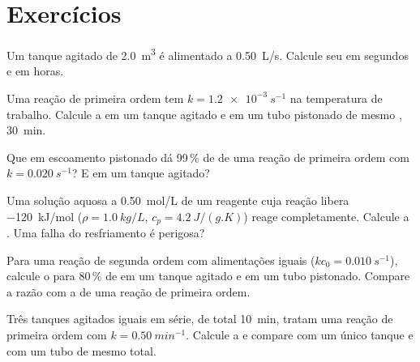 \section{Exercícios}

\begin{exercise}[$\star$]\label{exo:b2:continuous-reactors:1}
Um tanque agitado de \qty{2.0}{m^3} é alimentado a \qty{0.50}{L/s}. Calcule seu
 em segundos e em horas.
\end{exercise}

\begin{exercise}[$\star$]\label{exo:b2:continuous-reactors:2}
Uma reação de primeira ordem tem $k = \qty{1.2e-3}{s^{-1}}$ na temperatura de
trabalho. Calcule a  em um tanque agitado e em um tubo pistonado
de mesmo , \qty{30}{min}.
\end{exercise}

\begin{exercise}[$\star$]\label{exo:b2:continuous-reactors:3}
Que  em escoamento pistonado dá 99\,\% de  de uma
reação de primeira ordem com $k = \qty{0.020}{s^{-1}}$? E em um tanque agitado?
\end{exercise}

\begin{exercise}[$\star$]\label{exo:b2:continuous-reactors:4}
Uma solução aquosa a \qty{0.50}{mol/L} de um reagente cuja reação
libera \qty{-120}{kJ/mol} ($\rho = \qty{1.0}{kg/L}$, $c_p =
\qty{4.2}{J/(g.K)}$) reage completamente. Calcule a . Uma falha do resfriamento é perigosa?
\end{exercise}

\begin{exercise}[$\star\star$]\label{exo:b2:continuous-reactors:5}
Para uma reação de segunda ordem com alimentações iguais ($kc_0 = \qty{0.010}{s^{-1}}$),
calcule o  para 80\,\% de  em um tanque agitado e em um
tubo pistonado. Compare a razão com a de uma reação de primeira ordem.
\end{exercise}

\begin{exercise}[$\star\star$]\label{exo:b2:continuous-reactors:6}
Três tanques agitados iguais em série, de  total \qty{10}{min},
tratam uma reação de primeira ordem com $k = \qty{0.50}{min^{-1}}$. Calcule a
 e compare com um único tanque e com um tubo de mesmo  total.
\end{exercise}

